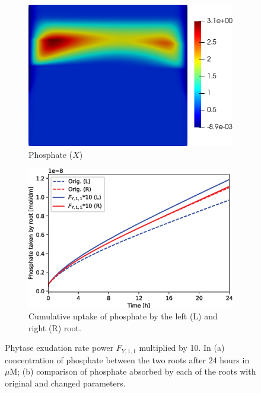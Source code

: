 \documentclass[11pt]{article}
\numberwithin{equation}{section}
\begin{document}
\begin{figure}[!htb]
\centering
\begin{subfigure}[t]{0.35\textwidth}
    \includegraphics[width=\textwidth]{Figures/X_Fy11times10.png}
    \caption{Phosphate ($X$)}
    \label{fig:numexp_FY11up1}
\end{subfigure}
\hspace{1cm}
\begin{subfigure}[t]{0.4\textwidth}
    \includegraphics[width=\textwidth]{Figures/Fy11times10.eps}
    \caption{Cumulative uptake of phosphate by the left (L) and right (R) root.}
    \label{fig:numexp_FY11up2}
\end{subfigure}

\caption{Phytase exudation rate power $F_{Y,1,1}$ multiplied by 10. In (a) concentration of phosphate between the two roots after 24 hours in $\mu$M; (b) comparison of phosphate absorbed by each of the roots with original and changed parameters.}
\end{figure}
\end{document}
